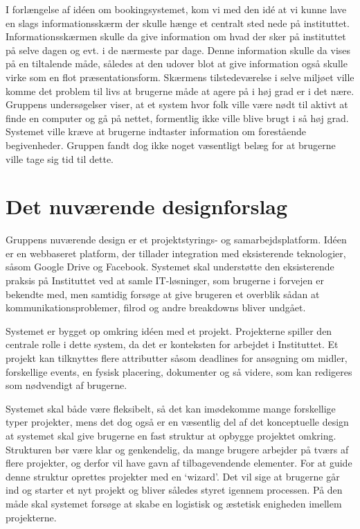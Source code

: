 I forlængelse af idéen om bookingsystemet, kom vi med den idé at vi kunne lave en slags informationsskærm der skulle hænge et centralt sted nede på instituttet. Informationsskærmen skulle da give information om hvad der sker på instituttet på selve dagen og evt. i de nærmeste par dage. Denne information skulle da vises på en tiltalende måde, således at den udover blot at give information også skulle virke som en flot præsentationsform. Skærmens tilstedeværelse i selve miljøet ville komme det problem til livs at brugerne måde at agere på i høj grad er i det nære. Gruppens undersøgelser viser, at et system hvor folk ville være nødt til aktivt at finde en computer og gå på nettet, formentlig ikke ville blive brugt i så høj grad. Systemet ville kræve at brugerne indtaster information om forestående begivenheder. Gruppen fandt dog ikke noget væsentligt belæg for at brugerne ville tage sig tid til dette.

\section{Det nuværende designforslag}
Gruppens nuværende design er et projektstyrings- og samarbejdsplatform.
Idéen er en webbaseret platform, der tillader integration med eksisterende teknologier, såsom Google Drive og Facebook. Systemet skal understøtte den eksisterende praksis på Instituttet ved at samle IT-løsninger, som brugerne i forvejen er bekendte med, men samtidig forsøge at give brugeren et overblik sådan at kommunikationsproblemer, filrod og andre breakdowns bliver undgået. 

Systemet er bygget op omkring idéen med et projekt. Projekterne spiller den centrale rolle i dette system, da det er konteksten for arbejdet i Instituttet. Et projekt kan tilknyttes flere attributter såsom deadlines for ansøgning om midler, forskellige events, en fysisk placering, dokumenter og så videre, som kan redigeres som nødvendigt af brugerne. 

Systemet skal både være fleksibelt, så det kan imødekomme mange forskellige typer projekter, mens det dog også er en væsentlig del af det konceptuelle design at systemet skal give brugerne en fast struktur at opbygge projektet omkring. Strukturen bør være klar og genkendelig, da mange brugere arbejder på tværs af flere projekter, og derfor vil have gavn af tilbagevendende elementer.
For at guide denne struktur oprettes projekter med en ‘wizard’. Det vil sige at brugerne går ind og starter et nyt projekt og bliver således styret igennem processen. På den måde skal systemet forsøge at skabe en logistisk og æstetisk enigheden imellem projekterne. 

